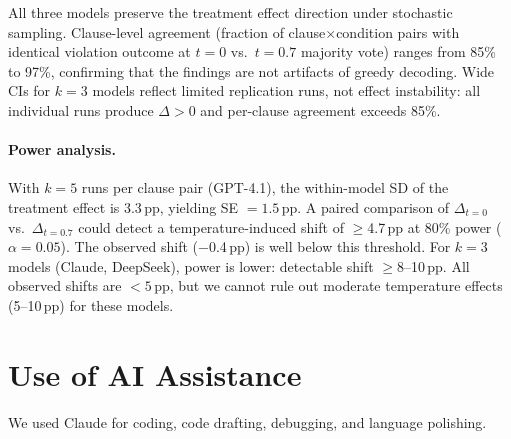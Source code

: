 \noindent All three models preserve the treatment effect direction under stochastic sampling. Clause-level agreement (fraction of clause$\times$condition pairs with identical violation outcome at $t=0$ vs.\ $t=0.7$ majority vote) ranges from 85\% to 97\%, confirming that the findings are not artifacts of greedy decoding. Wide CIs for $k = 3$ models reflect limited replication runs, not effect instability: all individual runs produce $\Delta > 0$ and per-clause agreement exceeds 85\%.

\paragraph{Power analysis.} With $k = 5$ runs per clause pair (GPT-4.1), the within-model SD of the treatment effect is 3.3\,pp, yielding SE $= 1.5$\,pp. A paired comparison of $\Delta_{t=0}$ vs.\ $\Delta_{t=0.7}$ could detect a temperature-induced shift of $\geq$4.7\,pp at 80\% power ($\alpha = 0.05$). The observed shift ($-$0.4\,pp) is well below this threshold. For $k = 3$ models (Claude, DeepSeek), power is lower: detectable shift $\geq$8--10\,pp. All observed shifts are $< 5$\,pp, but we cannot rule out moderate temperature effects (5--10\,pp) for these models.

\section{Use of AI Assistance}
We used Claude for coding, code drafting, debugging, and language polishing.
